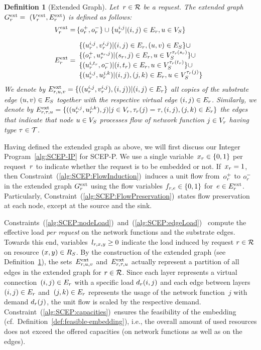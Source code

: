 \documentclass[10pt, conference, letterpaper]{IEEEtran}
\newtheorem{definition}[theorem]{Definition}
\begin{document}
\begin{definition}[Extended Graph]
\label{def:extended-graph}
Let~$\req \in \requests$ be a request. The extended graph~$\VGext =~(\VVext, \VEext)$ is defined as follows:
\begin{alignat}{1}
\VVext = &  \,\{ \Vsource,\Vsink \} \cup \{u^{i,j}_{\req} | (i,j) \in \VE, u \in \SV \} \\[6pt]
 \VEext = & 
\begin{array}{l}
\{ (u^{i,j}_{\req}, v^{i,j}_{\req}) | (i,j) \in \VE, (u,v) \in \SE \} \cup \\
\{ (\Vsource,u^{\Vstart, j}_{\req}) | (\Vstart,j) \in \VE, u \in \SVTypes[\Vtype(\Vstart)] \} \cup \\
\{ (u^{i,\Vend}_{\req}, \Vsink) | (i,\Vend) \in \VE, u \in \SVTypes[\Vtype(\Vend)] \} \cup \\
 \{ (u^{i,j}_{\req}, u^{j,k}_{\req}) | (i,j), (j,k) \in \VE, u \in \SVTypes[\Vtype(j)] \}
\end{array}
\end{alignat}
We denote by $\VEextHorizontal = \{((u^{i,j}_{\req}, v^{i,j}_{\req}),(i,j)) | (i,j) \in \VE\}$ all copies of the substrate edge $(u,v) \in \SE$ together with the respective virtual edge $(i,j) \in \VE$. Similarly, we denote by $\VEextVertical = \{((u^{i,j}_{\req}, u^{j,k}_{\req}),j) | j \in \VV, \Vtype(j) = \type, (i,j), (j,k) \in \VE\}$ the edges that indicate that node $u \in \SV$ processes flow of network function $j \in \VV$ having type $\type \in \types$.
\end{definition}


Having defined the extended graph as above, we will first discuss our Integer Program~\ref{alg:SCEP-IP} for SCEP-P. We use a single 
variable~$x_{\req} \in \{0,1\}$ per request~$\req$ to indicate whether
the request is to be embedded or not. If~$x_{\req} = 1$, then Constraint~(\ref{alg:SCEP:FlowInduction})~induces a unit flow 
from~$\Vsource$ to $\Vsink$ in the extended graph $\VGext$ using the flow variables 
$f_{\req,e} \in \{0,1\}$ for~$e \in \VEext$. Particularly, Constraint~(\ref{alg:SCEP:FlowPreservation})~states flow preservation at each node, except at the source and the sink.

Constraints~(\ref{alg:SCEP:nodeLoad})~and~(\ref{alg:SCEP:edgeLoad})~
compute the effective load \emph{per request} on the network functions 
and the substrate edges. Towards this end, variables~$l_{\req,x,y} \geq 0$ indicate the load induced by request $r \in \requests$ on resource $(x,y) \in  \SR$. By the construction of the extended graph (see Definition~\ref{def:extended-graph}), 
the sets~$\VEextHorizontal$ and~$\VEextVertical$  actually represent 
a partition of all edges in the extended graph for $\req \in \requests$. Since each 
layer represents a virtual connection~$(i,j) \in \VE$ with a specific load 
$\Vcap(i,j)$ and each edge between layers~$(i,j) \in  \VE$ and~$(j,k) \in  \VE$ 
represents the usage of the network function~$j$ with demand 
$\Vcap(j)$, the unit flow is scaled by the respective demand. Constraint~(\ref{alg:SCEP:capacities})~ensures the feasibility of the embedding (cf.~Definition~\ref{def:feasible-embedding}), i.e., 
the overall amount of used resources does not exceed the offered capacities 
(on network functions as well as on the edges). 
\end{document}
